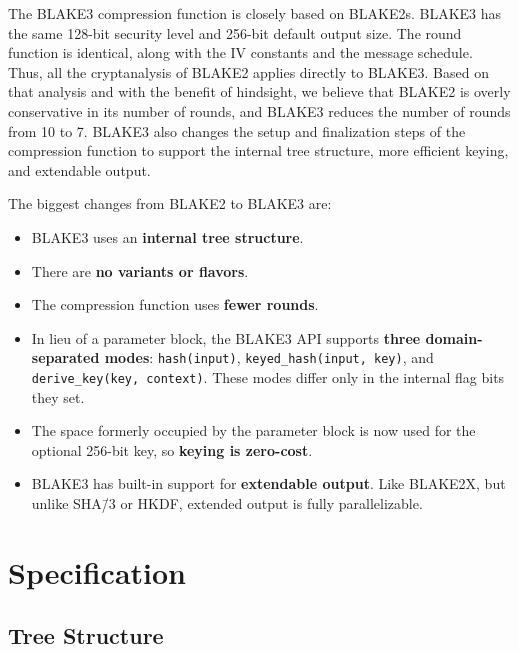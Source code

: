 \documentclass[11pt,notitlepage,a4paper]{article}
\begin{document}
The BLAKE3 compression function is closely based on BLAKE2s. BLAKE3 has the
same 128-bit security level and 256-bit default output size. The round function
is identical, along with the IV constants and the message schedule. Thus, all
the cryptanalysis of BLAKE2 applies directly to BLAKE3. Based on that analysis
and with the benefit of hindsight, we believe that BLAKE2 is overly
conservative in its number of rounds, and BLAKE3 reduces the number of rounds
from 10 to 7. BLAKE3 also changes the setup and finalization steps of the
compression function to support the internal tree structure, more efficient
keying, and extendable output.

The biggest changes from BLAKE2 to BLAKE3 are:

\begin{itemize}
    \item BLAKE3 uses an \textbf{internal tree structure}.
    \item There are \textbf{no variants or flavors}.
    \item The compression function uses \textbf{fewer rounds}.
    \item In lieu of a parameter block, the BLAKE3 API supports \textbf{three
        domain-separated modes}: \texttt{hash(input)},
        \texttt{keyed\_hash(input, key)}, and \texttt{derive\_key(key,
        context)}. These modes differ only in the internal flag bits they set.
    \item The space formerly occupied by the parameter block is now used for
        the optional 256-bit key, so \textbf{keying is zero-cost}.
    \item BLAKE3 has built-in support for \textbf{extendable output}. Like
        BLAKE2X, but unlike SHA\=/3 or HKDF, extended output is fully
        parallelizable.
\end{itemize}

\section{Specification}\label{sec:specification}

\subsection{Tree Structure}\label{sec:tree}
\end{document}
